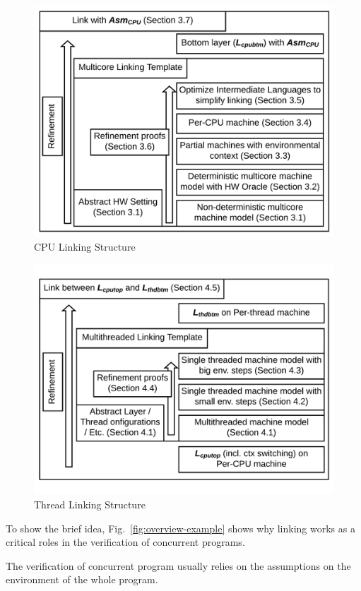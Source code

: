 \begin{figure}
\begin{center}
\includegraphics[scale=.30]{figs/cpu_linking_structure}
\end{center}
\caption{CPU Linking Structure}
\label{fig:cpu-linking-structure}
\end{figure}


\begin{figure}
\begin{center}
\includegraphics[scale=.30]{figs/thread_linking_structure}
\end{center}
\caption{Thread Linking Structure}
\label{fig:thread-linking-structure}
\end{figure}


To show the brief idea, Fig.~\ref{fig:overview-example} shows why linking works as a critical roles in the 
verification of concurrent programs. 

The verification of concurrent program usually relies on the assumptions on 
the environment of the whole program. 


%


